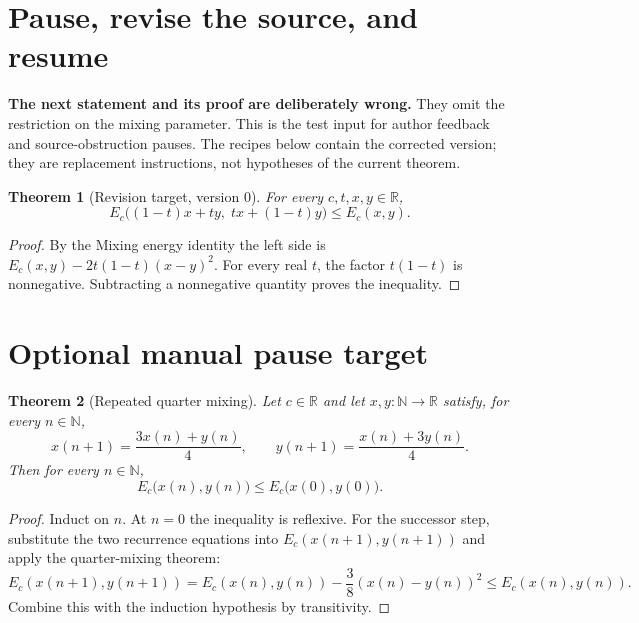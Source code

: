 \documentclass[11pt]{article}
\newtheorem{theorem}{Theorem}
\begin{document}
\section{Pause, revise the source, and resume}

\noindent\textbf{The next statement and its proof are deliberately wrong.}
They omit the restriction on the mixing parameter. This is the test input
for author feedback and source-obstruction pauses. The recipes below
contain the corrected version; they are replacement instructions, not
hypotheses of the current theorem.

\begin{theorem}[Revision target, version 0]\label{thm:mix-revision-bound}
For every $c,t,x,y\in\mathbb{R}$,
\[
 E_c\bigl((1-t)x+ty,\;tx+(1-t)y\bigr)\le E_c(x,y).
\]
\end{theorem}
\begin{proof}
By the Mixing energy identity the left side is
$E_c(x,y)-2t(1-t)(x-y)^2$.
For every real $t$, the factor $t(1-t)$ is nonnegative.
Subtracting a nonnegative quantity proves the inequality.
\end{proof}

\section{Optional manual pause target}

\begin{theorem}[Repeated quarter mixing]\label{thm:mix-iterated-bound}
Let $c\in\mathbb{R}$ and let $x,y:\mathbb{N}\to\mathbb{R}$ satisfy,
for every $n\in\mathbb{N}$,
\[
 x(n+1)=\frac{3x(n)+y(n)}4,
 \qquad y(n+1)=\frac{x(n)+3y(n)}4.
\]
Then for every $n\in\mathbb{N}$,
\[
 E_c\bigl(x(n),y(n)\bigr)\le E_c\bigl(x(0),y(0)\bigr).
\]
\end{theorem}
\begin{proof}
Induct on $n$. At $n=0$ the inequality is reflexive.
For the successor step, substitute the two recurrence equations into
$E_c(x(n+1),y(n+1))$ and apply the quarter-mixing theorem:
\[
 E_c(x(n+1),y(n+1))
 =E_c(x(n),y(n))-\frac38(x(n)-y(n))^2
 \le E_c(x(n),y(n)).
\]
Combine this with the induction hypothesis by transitivity.
\end{proof}
\end{document}
